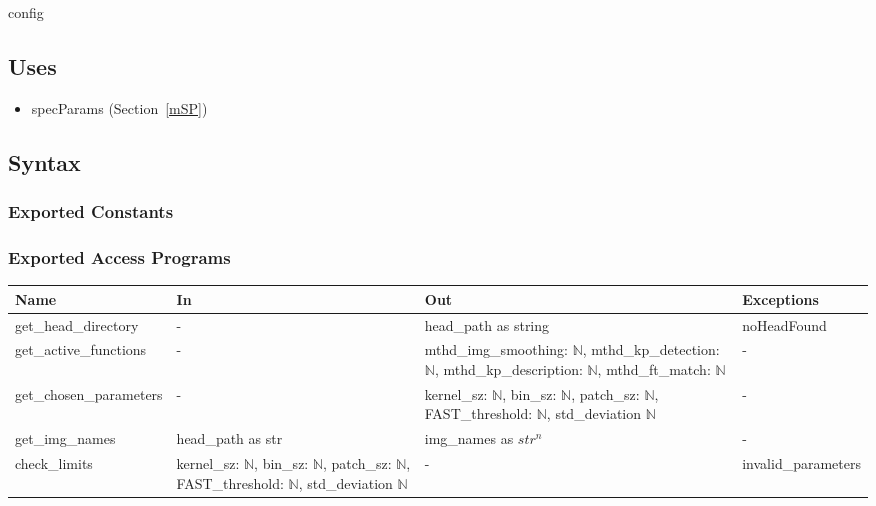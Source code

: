 \documentclass[12pt, titlepage]{article}
\begin{document}
config

\subsection{Uses}
\begin{itemize}
\item specParams (Section~\ref{mSP})
\end{itemize}

\subsection{Syntax}

\subsubsection{Exported Constants}

\subsubsection{Exported Access Programs}
\begin{tabular}{p{4cm} p{4cm} p{4.5cm} p{3.5cm}}
\hline
\textbf{Name} & \textbf{In} & \textbf{Out} & \textbf{Exceptions} \\
\hline
get\_head\_directory 
& - 
& head\_path as string 
& noHeadFound \\
\hline
get\_active\_functions 
& - 
& mthd\_img\_smoothing: $\mathbb{N}$, \newline 
mthd\_kp\_detection: $\mathbb{N}$, \newline 
mthd\_kp\_description: $\mathbb{N}$, \newline 
mthd\_ft\_match: $\mathbb{N}$
& - \\
\hline
get\_chosen\_parameters & - 
& kernel\_sz: $\mathbb{N}$, \newline 
bin\_sz: $\mathbb{N}$, \newline  
patch\_sz: $\mathbb{N}$, \newline 
FAST\_threshold: $\mathbb{N}$, \newline 
std\_deviation $\mathbb{N}$
& - \\
\hline
get\_img\_names 
& head\_path as str 
& img\_names as $str^{n}$ 
& - \\
\hline
check\_limits 
& kernel\_sz: $\mathbb{N}$, \newline 
bin\_sz: $\mathbb{N}$, \newline  
patch\_sz: $\mathbb{N}$, \newline 
FAST\_threshold: $\mathbb{N}$, \newline 
std\_deviation $\mathbb{N}$
& - 
& invalid\_parameters\\
\hline
\end{tabular}
\end{document}

